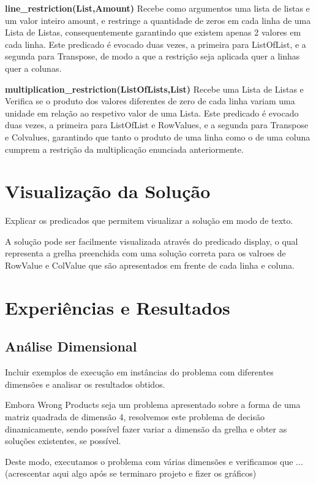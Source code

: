 \documentclass[11pt]{article}
\begin{document}
\textbf{line\_restriction(List,Amount)} Recebe como argumentos uma lista de listas e um valor inteiro amount, e restringe a quantidade de zeros em cada linha de uma Lista de Listas, consequentemente garantindo que existem apenas 2 valores em cada linha. Este predicado é evocado duas vezes, a primeira para ListOfList, e a segunda para Transpose, de modo a que a restrição seja aplicada quer a linhas quer a colunas.


\textbf{multiplication\_restriction(ListOfLists,List)} Recebe uma Lista de Listas e Verifica se o produto dos valores diferentes de zero de cada linha variam uma unidade em relação ao respetivo valor de uma Lista. Este predicado é evocado duas vezes, a primeira para ListOfList e RowValues, e a segunda para Transpose e Colvalues, garantindo que tanto o produto de uma linha como o de uma coluna cumprem a restrição da multiplicação enunciada anteriormente.


\section{Visualização da Solução} Explicar os predicados que permitem
visualizar a solução em modo de texto.

A solução pode ser facilmente visualizada através do predicado display, o qual representa a grelha preenchida com uma solução correta para os valroes de RowValue e ColValue que são apresentados em frente de cada linha e coluna.


\section{Experiências e Resultados}

\subsection{Análise Dimensional} Incluir exemplos de execução em instâncias do problema com
diferentes dimensões e analisar os resultados obtidos.

Embora Wrong Products seja um problema apresentado sobre a forma de uma matriz quadrada de dimensão 4, resolvemos este problema de decisão dinamicamente, sendo possível fazer variar a dimensão da grelha e obter as soluções existentes, se possível.

Deste modo, executamos o problema com várias dimensões e verificamos que ...(acrescentar aqui algo após se terminaro projeto e fizer os gráficos)
\end{document}
